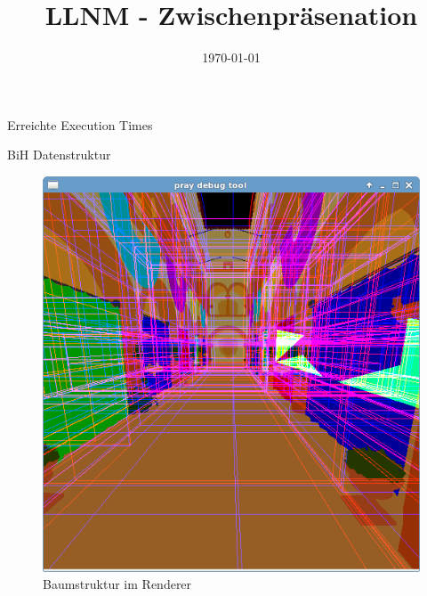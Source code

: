 

\title[LLNM]{LLNM - Zwischenpräsenation}
\subtitle{}
\date{\today}

	\begin{frame}
		\titlepage
	\end{frame}
	\begin{frame}{Erreichte Execution Times}
		
	\end{frame}
	\begin{frame}{BiH Datenstruktur}
		\begin{figure}[ht]
        \begin{minipage}[b]{0.45\linewidth}
            \centering
            \includegraphics[width=\textwidth]{images/bih1.png}
            \caption{Baumstruktur im Renderer}
            \label{fig:a}
        \end{minipage}
        \hspace{0.5cm}
        \begin{minipage}[b]{0.45\linewidth}
            \centering

\end{minipage}
\end{figure}
\end{frame}
